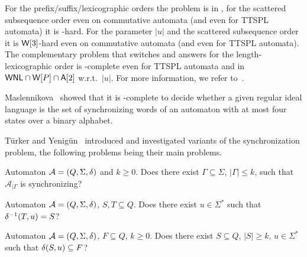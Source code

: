 For the prefix/suffix/lexicographic orders the problem is in \PTIME, 
for the scattered subsequence order even on commutative automata (and even for TTSPL automata)
it is \NP-hard.
For the parameter $|u|$ and the scattered subsequence order
it is $\textup{\textsf{W}}[3]$-hard even on commutative automata (and even for TTSPL automata).
The complementary problem that switches {\rYES} and \rNO answers
for the length-lexicographic order is \NP-complete even for TTSPL automata
and in $\textsf{WNL}\cap \textup{\textsf{W}}[P]\cap \textsf{A}[2]$ w.r.t.~$|u|$.
For more information, we refer to~\cite{DBLP:journals/ita/BruchertseiferF21,DBLP:journals/mscs/FernauB22,FernauHoffmann19}.

Maslennikova~\cite{DBLP:journals/ijfcs/Maslennikova19}
showed that it is \PSPACE-complete
to decide whether a given regular ideal language
is the set of synchronizing words of an automaton
with at most four states over a binary alphabet.

Türker and Yenigün~\cite{DBLP:journals/ijfcs/TurkerY15}
introduced and investigated
variants of the synchronization problem, 
the following problems being their main problems.

{Automaton $\mathcal A = (Q, \Sigma, \delta)$ and $k \ge 0$.}
{Does there exist $\Gamma \subseteq \Sigma$, $|\Gamma| \le k$, such that $\mathcal A_{|\Gamma}$ is synchronizing?}

{Automaton $\mathcal A = (Q, \Sigma, \delta)$, $S, T \subseteq Q$.}
{Does there exist $u \in \Sigma^*$ such that $\delta^{-1}(T,u) = S$?}

{Automaton $\mathcal A = (Q, \Sigma, \delta)$, $F \subseteq Q$, $k \ge 0$.}
{Does there exist $S \subseteq Q$, $|S| \ge k$, $u \in \Sigma^*$ such that $\delta(S,u) \subseteq F$?}


